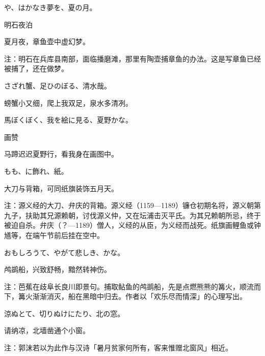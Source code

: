 \begin{haiku}
    {\FH {}や、はかなき夢を、夏の月。}

    {\FK 明石夜泊}

    {\FK 夏月夜，章鱼壶中虚幻梦。}

    {\FT 注：明石在兵库县南部，面临播磨滩，那里有陶壶捕章鱼的办法。这是写章鱼已经被捕了，还在做梦。}
\end{haiku}

\begin{haiku}
    {\FH さざれ蟹、足ひのぼる、清水哉。}

    {\FK 螃蟹小又细，爬上我双足，泉水多清冽。}
\end{haiku}

\begin{haiku}
    {\FH 馬ぼくぼく、我を絵に見る、夏野かな。}

    {\FK 画赞}

    {\FK 马蹄迟迟夏野行，看我身在画图中。}
\end{haiku}

\begin{haiku}
    {\FH {}もも、に飾れ、紙。}

    {\FK 大刀与背箱，可同纸旗装饰五月天。}

    {\FT 注：源义经的大刀、弁庆的背箱。源义经（1159—1189）镰仓初期名将，源义朝第九子，扶助其兄源赖朝，讨伐源义仲，又在坛浦击灭平氏。为其兄赖朝所忌，终于被迫自杀。弁庆（？—1189）僧人，义经的从臣，为义经而战死。纸旗画鲤鱼或钟馗等，在端午节前后挂在空中。}
\end{haiku}

\begin{haiku}
    {\FH おもしろうて、やがて悲しき、かな。}

    {\FK 鸬鹚船，兴致舒畅，黯然转神伤。}

    {\FT 注：芭蕉在歧阜长良川即景句。捕取鲇鱼的鸬鹚船，先是点燃熊熊的篝火，顺流而下，篝火渐渐消灭，船在黑暗中归去。作者以「欢乐尽而情深」的心理写出。}
\end{haiku}

\begin{haiku}
    {\FH 涼ぬとて、切りぬけにたり、北の窓。}

    {\FK 请纳凉，北墙凿通个小窗。}

    {\FT 注：郭沫若以为此作与汉诗「暑月贫家何所有，客来惟赠北窗风」相近。}
\end{haiku}


